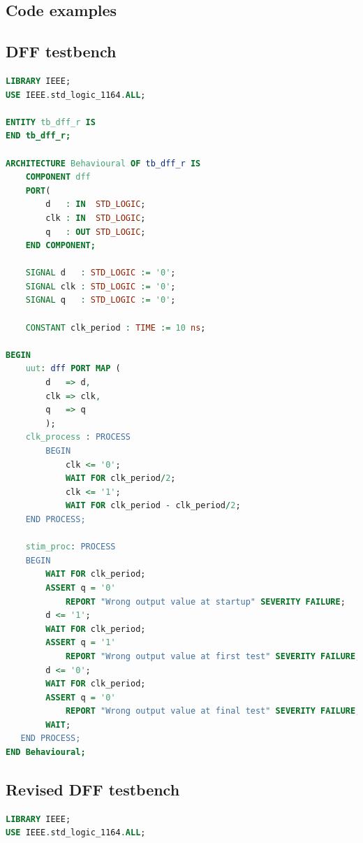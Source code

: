 \documentclass[11pt,british]{article}
\begin{document}
\newpage{}

\begin{appendices}

\section{Code examples}
\subsection{DFF testbench}
\label{app:dfftestbench}

\begin{lstlisting}[language=VHDL, tabsize=4, frame=single, framesep=2mm, belowskip=4pt, aboveskip=4pt, showstringspaces=false, basicstyle=\scriptsize]
LIBRARY IEEE;
USE IEEE.std_logic_1164.ALL;

ENTITY tb_dff_r IS
END tb_dff_r;

ARCHITECTURE Behavioural OF tb_dff_r IS
	COMPONENT dff
    PORT(
		d 	: IN  STD_LOGIC;
        clk : IN  STD_LOGIC;
		q 	: OUT STD_LOGIC;
    END COMPONENT;
    
	SIGNAL d   : STD_LOGIC := '0';
	SIGNAL clk : STD_LOGIC := '0';
	SIGNAL q   : STD_LOGIC := '0';

	CONSTANT clk_period : TIME := 10 ns;
	
BEGIN
	uut: dff PORT MAP (
        d 	=> d,
        clk => clk,
		q 	=> q
        );
	clk_process : PROCESS
		BEGIN
			clk <= '0';
			WAIT FOR clk_period/2;
			clk <= '1';
			WAIT FOR clk_period - clk_period/2;
	END PROCESS;
	
	stim_proc: PROCESS
	BEGIN		
     	WAIT FOR clk_period;
     	ASSERT q = '0'
			REPORT "Wrong output value at startup" SEVERITY FAILURE;
		d <= '1';
     	WAIT FOR clk_period;
     	ASSERT q = '1'
			REPORT "Wrong output value at first test" SEVERITY FAILURE;
		d <= '0';
     	WAIT FOR clk_period;
     	ASSERT q = '0'
			REPORT "Wrong output value at final test" SEVERITY FAILURE;
		WAIT;
   END PROCESS;
END Behavioural;
\end{lstlisting}

\newpage{}
\subsection{Revised DFF testbench}
\label{app:dfftestbench2}
\begin{lstlisting}[language=VHDL, tabsize=4, frame=single, framesep=2mm, belowskip=4pt, aboveskip=4pt, showstringspaces=false, basicstyle=\scriptsize]
LIBRARY IEEE;
USE IEEE.std_logic_1164.ALL;


\end{lstlisting}
\end{appendices}
\end{document}
